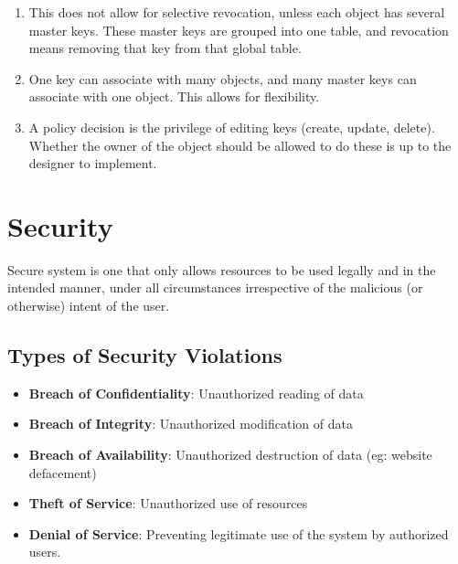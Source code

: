 \documentclass{article}
\theoremstyle{plain}
\theoremstyle{definition}
\begin{document}
\begin{itemize}
\begin{itemize}
\begin{enumerate}
            \item This does not allow for selective revocation, unless each object has several master keys. These master keys are grouped into one table, and revocation means removing that key from that global table. 
            
            \item One key can associate with many objects, and many master keys can associate with one object. This allows for flexibility. 
            
            \item A policy decision is the privilege of editing keys (create, update, delete). Whether the owner of the object should be allowed to do these is up to the designer to implement. 
        \end{enumerate}
    \end{itemize}
\end{itemize}

\section{Security}
Secure system is one that only allows resources to be used legally and in the intended manner, under all circumstances irrespective of the malicious (or otherwise) intent of the user. 

\subsection{Types of Security Violations}
\begin{itemize}
    \item \textbf{Breach of Confidentiality}: Unauthorized reading of data
    
    \item \textbf{Breach of Integrity}: Unauthorized modification of data
    
    \item \textbf{Breach of Availability}: Unauthorized destruction of data (eg: website defacement)
    
    \item \textbf{Theft of Service}: Unauthorized use of resources
    
    \item \textbf{Denial of Service}: Preventing legitimate use of the system by authorized users. 
\end{itemize} 
\end{document}
